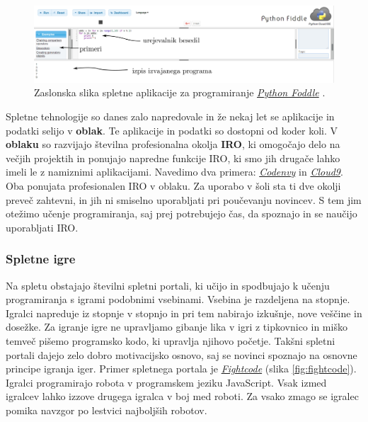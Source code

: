 \begin{figure}[h!]
    \includegraphics [width=1\linewidth, keepaspectratio =
    1] {./images/sc_web/PythonFiddle_01.jpg}
    \caption{Zaslonska slika spletne aplikacije za programiranje
      \emph{\href{http://pythonfiddle.com/}{Python Foddle}}
      \cite{web:pythonfiddle}.}
    \label{fig:scr:web:PyFiddle}
\end{figure}

Spletne tehnologije so danes zalo napredovale in že nekaj let se
aplikacije in podatki selijo v \textbf{oblak}. Te aplikacije in
podatki so dostopni od koder koli. V \textbf{oblaku} so razvijajo
številna profesionalna okolja \textbf{IRO}, ki omogočajo delo na
večjih projektih in ponujajo napredne funkcije IRO, ki smo jih drugače
lahko imeli le z namiznimi aplikacijami. Navedimo dva primera:
\emph{\href{https://codenvy.com/}{Codenvy}} \cite{web:codeenvy} in
\emph{\href{https://c9.io/}{Cloud9}}\cite{web:cloud9}. Oba ponujata
profesionalen IRO v oblaku. Za uporabo v šoli sta ti dve okolji preveč
zahtevni, in jih ni smiselno uporabljati pri poučevanju novincev. S
tem jim otežimo učenje programiranja, saj prej potrebujejo čas, da
spoznajo in se naučijo uporabljati IRO.

\subsubsection{Spletne igre}
\label{sec:spletne_igre}

Na spletu obstajajo številni spletni portali, ki učijo in spodbujajo k
učenju programiranja s igrami podobnimi vsebinami. Vsebina je
razdeljena na stopnje. Igralci napreduje iz stopnje v stopnjo in pri
tem nabirajo izkušnje, nove veščine in dosežke. Za igranje igre ne
upravljamo gibanje lika v igri z tipkovnico in miško temveč pišemo
programsko kodo, ki upravlja njihovo početje. Takšni spletni portali
dajejo zelo dobro motivacijsko osnovo, saj se novinci spoznajo na
osnovne principe igranja iger. Primer spletnega portala je
\emph{\href{http://fightcodegame.com/}{Fightcode}}
\cite{web:fightcode} (slika \ref{fig:fightcode}). Igralci programirajo robota v programskem jeziku
JavaScript. Vsak izmed igralcev lahko izzove drugega igralca v boj med
roboti. Za vsako zmago se igralec pomika navzgor po lestvici
najboljših robotov.

